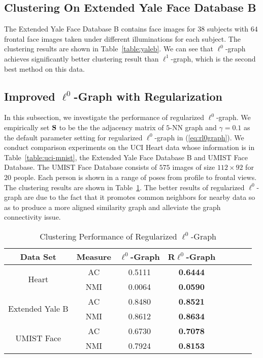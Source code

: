 \documentclass[10pt,twocolumn,letterpaper]{article}
\begin{document}
\subsection{Clustering On Extended Yale Face Database B}
The Extended Yale Face Database B contains face images for $38$ subjects with $64$ frontal face images taken under different illuminations for each subject. The clustering results are shown in Table~\ref{table:yaleb}. We can see that $\ell^{0}$-graph achieves significantly better clustering result than $\ell^{1}$-graph, which is the second best method on this data.

\subsection{Improved $\ell^{0}$-Graph with Regularization}
In this subsection, we investigate the performance of regularized $\ell^{0}$-graph. We empirically set $\mathbf{S}$ to be the the adjacency matrix of $5$-NN graph and $\gamma = 0.1$ as the default parameter setting for regularized $\ell^{0}$-graph in (\ref{eq:rl0graph}). We conduct comparison experiments on the UCI Heart data whose information is in Table~\ref{table:uci-mnist}, the Extended Yale Face Database B and UMIST Face Database. The UMIST Face Database consists of $575$ images of size $112 \times 92$ for $20$ people. Each person is shown in a range of poses from profile to frontal views. The clustering results are shown in Table~\ref{table:rl0graph}. The better results of regularized $\ell^{0}$-graph are due to the fact that it promotes common neighbors for nearby data so as to produce a more aligned similarity graph and alleviate the graph connectivity issue.
\begin{table}[ht]
\centering
\caption{\small Clustering Performance of Regularized $\ell^{0}$-Graph}
\begin{tabular}{|c|c|c|c|c|c|c|c|}
  \hline
  Data Set

                                        &Measure &$\ell^{0}$-Graph &R$\ell^{0}$-Graph   \\\hline

  \multirow{2}{*}{Heart}                &AC      &0.5111 &\textbf{0.6444}  \\ \cline{2-4}
                                        &NMI     &0.0064 &\textbf{0.0590}  \\ \hline

  \multirow{2}{*}{Extended Yale B}      &AC      &0.8480 &\textbf{0.8521}  \\ \cline{2-4}
                                        &NMI     &0.8612 &\textbf{0.8634} \\ \hline

  \multirow{2}{*}{UMIST Face}           &AC      &0.6730 &\textbf{0.7078}  \\ \cline{2-4}
                                        &NMI     &0.7924 &\textbf{0.8153} \\ \hline
\end{tabular}
\label{table:rl0graph}
\end{table}
\end{document}
